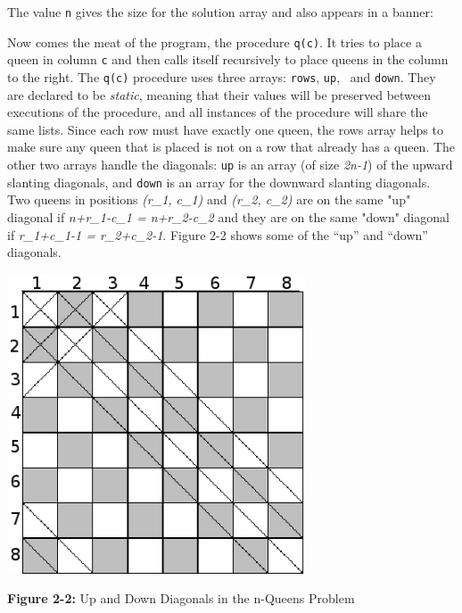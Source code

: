 
The value \texttt{n} gives the size for the solution array and also
appears in a banner:


Now comes the meat of the program, the procedure \texttt{q(c)}. It tries
to place a queen in column \texttt{c} and then calls itself recursively
to place queens in the column to the right. The \texttt{q(c)} procedure
uses three arrays: \texttt{rows}, \texttt{up}, \ and \texttt{down}.
They are declared to be \textit{static}, meaning that their values will
be preserved between executions of the procedure, and all
instances of the procedure will share the same lists.
Since each row must have exactly one queen, the rows array helps to
make sure any queen that is placed is not on a row that already has a
queen. The other two arrays handle the diagonals: \texttt{up} is an
array (of size \textit{2n-1}) of the upward slanting diagonals, and
\texttt{down} is an array for the downward slanting diagonals. Two
queens in positions \textit{(r\_1, c\_1)} and \textit{(r\_2, c\_2)} are
on the same "up" diagonal if
\textit{n+r\_1-c\_1 = n+r\_2-c\_2} and they are on the same
"down" diagonal if \textit{r\_1+c\_1-1 =
r\_2+c\_2-1}. Figure 2-2 shows some of the
``up'' and ``down'' diagonals.

\bigskip

\begin{center}
\includegraphics[width=3.5in,height=3.5in]{ub-img/diagonal.png}
\end{center}
{\sffamily\bfseries Figure 2-2:}
{\sffamily Up and Down Diagonals in the n-Queens Problem}

